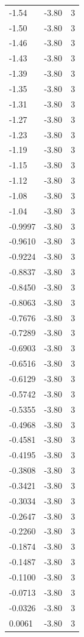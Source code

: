 \begin{longtable}{lrr}
  -1.54 & -3.80 & 3 \\
  -1.50 & -3.80 & 3 \\
  -1.46 & -3.80 & 3 \\
  -1.43 & -3.80 & 3 \\
  -1.39 & -3.80 & 3 \\
  -1.35 & -3.80 & 3 \\
  -1.31 & -3.80 & 3 \\
  -1.27 & -3.80 & 3 \\
  -1.23 & -3.80 & 3 \\
  -1.19 & -3.80 & 3 \\
  -1.15 & -3.80 & 3 \\
  -1.12 & -3.80 & 3 \\
  -1.08 & -3.80 & 3 \\
  -1.04 & -3.80 & 3 \\
  -0.9997 & -3.80 & 3 \\
  -0.9610 & -3.80 & 3 \\
  -0.9224 & -3.80 & 3 \\
  -0.8837 & -3.80 & 3 \\
  -0.8450 & -3.80 & 3 \\
  -0.8063 & -3.80 & 3 \\
  -0.7676 & -3.80 & 3 \\
  -0.7289 & -3.80 & 3 \\
  -0.6903 & -3.80 & 3 \\
  -0.6516 & -3.80 & 3 \\
  -0.6129 & -3.80 & 3 \\
  -0.5742 & -3.80 & 3 \\
  -0.5355 & -3.80 & 3 \\
  -0.4968 & -3.80 & 3 \\
  -0.4581 & -3.80 & 3 \\
  -0.4195 & -3.80 & 3 \\
  -0.3808 & -3.80 & 3 \\
  -0.3421 & -3.80 & 3 \\
  -0.3034 & -3.80 & 3 \\
  -0.2647 & -3.80 & 3 \\
  -0.2260 & -3.80 & 3 \\
  -0.1874 & -3.80 & 3 \\
  -0.1487 & -3.80 & 3 \\
  -0.1100 & -3.80 & 3 \\
  -0.0713 & -3.80 & 3 \\
  -0.0326 & -3.80 & 3 \\
  0.0061 & -3.80 & 3 \\

\end{longtable}

